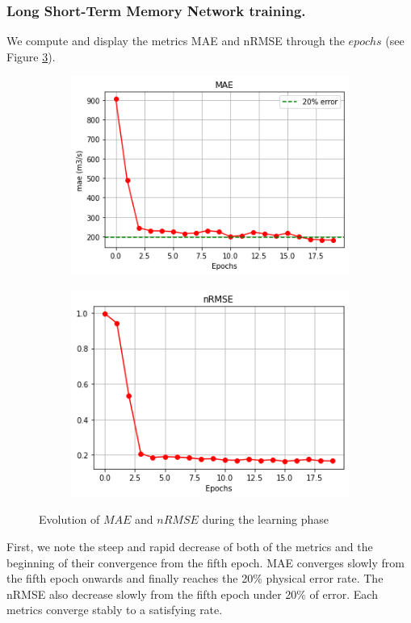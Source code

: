 \subsubsection{Long Short-Term Memory Network training.}
We compute and display the metrics MAE and nRMSE through the $epochs$ (see Figure \ref{fig:metricsLSTM}). 
\begin{figure}[H]
    \begin{subfigure}{0.45 \textwidth}
        \centering
        \includegraphics[scale = 0.5]{Graph/mae_lstm.png}
        \label{fig:my_label}
    \end{subfigure}
    \centering
     \begin{subfigure}{0.45 \textwidth}
         \centering
        \includegraphics[scale = 0.5]{Graph/nrmse_lstm.png}
        \label{fig:my_label}
     \end{subfigure}
     \caption{Evolution of $MAE$ and $nRMSE$ during the learning phase}
     \label{fig:metricsLSTM}
     
\end{figure}

First, we note the steep and rapid decrease of both of the metrics and the beginning of their convergence from the fifth epoch. MAE converges slowly from the fifth epoch onwards and finally reaches the 20\% physical error rate. The nRMSE also decrease slowly from the fifth epoch under 
20\% of error. Each metrics converge stably to a satisfying rate.  


